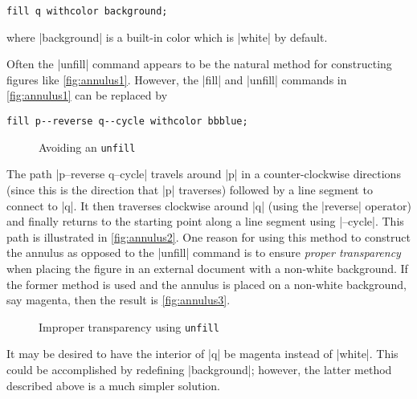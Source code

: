 \begin{lstlisting}[style=MP]
fill q withcolor background;
\end{lstlisting}
where |background| is a built-in color which is |white| by default.

Often the |unfill| command appears to be the natural method for
constructing figures like \autoref{fig:annulus1}.  However, the |fill|
and |unfill| commands in \autoref{fig:annulus1} can be replaced by

\begin{lstlisting}[style=MP]
fill p--reverse q--cycle withcolor bbblue;
\end{lstlisting}

\begin{figure}
  \centering
  \caption{Avoiding an \texttt{unfill}}
  \label{fig:annulus2}
\end{figure}

The path |p--reverse q--cycle| travels around |p| in a counter-clockwise
directions (since this is the direction that |p| traverses) followed by
a line segment to connect to |q|.  It then traverses clockwise around
|q| (using the |reverse| operator) and finally returns to the starting
point along a line segment using |--cycle|.  This path is illustrated in
\autoref{fig:annulus2}.  One reason for using this method to construct
the annulus as opposed to the |unfill| command is to ensure
\textit{proper transparency} when placing the figure in an external
document with a non-white background.  If the former method is used and
the annulus is placed on a non-white background, say magenta, then the
result is \autoref{fig:annulus3}.

\begin{figure}
  \centering
  \caption{Improper transparency using \texttt{unfill}}
  \label{fig:annulus3}
\end{figure}

It may be desired to have the interior of |q| be magenta instead of
|white|.  This could be accomplished by redefining |background|;
however, the latter method described above is a much simpler solution.
